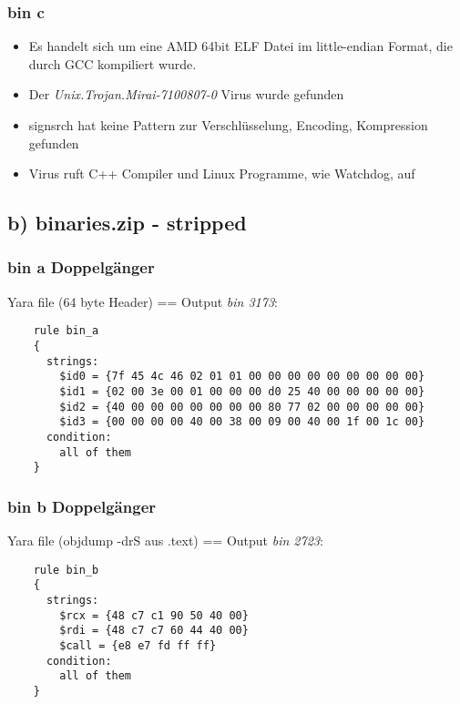 \subsubsection*{bin c}

\begin{itemize}
    \item Es handelt sich um eine AMD 64bit ELF Datei im little-endian Format, die durch GCC kompiliert wurde.
    \item Der \textit{Unix.Trojan.Mirai-7100807-0} Virus wurde gefunden
    \item signsrch hat keine Pattern zur Verschlüsselung, Encoding, Kompression gefunden
    \item Virus ruft C++ Compiler und Linux Programme, wie Watchdog, auf
\end{itemize}

\subsection*{b) binaries.zip - stripped}

\subsubsection*{bin a Doppelgänger}

Yara file (64 byte Header) == Output \textit{bin 3173}:

\begin{lstlisting}
    rule bin_a
    {
      strings:
        $id0 = {7f 45 4c 46 02 01 01 00 00 00 00 00 00 00 00 00}
        $id1 = {02 00 3e 00 01 00 00 00 d0 25 40 00 00 00 00 00}
        $id2 = {40 00 00 00 00 00 00 00 80 77 02 00 00 00 00 00}
        $id3 = {00 00 00 00 40 00 38 00 09 00 40 00 1f 00 1c 00}
      condition:
        all of them
    }
\end{lstlisting}

\subsubsection*{bin b Doppelgänger}

Yara file (objdump -drS aus .text) == Output \textit{bin 2723}:

\begin{lstlisting}
    rule bin_b
    {
      strings:
        $rcx = {48 c7 c1 90 50 40 00}
        $rdi = {48 c7 c7 60 44 40 00}
        $call = {e8 e7 fd ff ff}
      condition:
        all of them
    }
\end{lstlisting}

